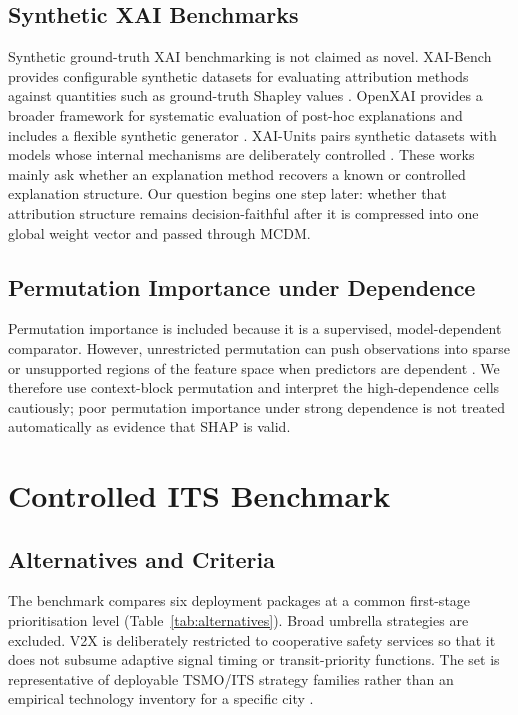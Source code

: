 \documentclass[runningheads]{llncs}
\begin{document}
\subsection{Synthetic XAI Benchmarks}

Synthetic ground-truth XAI benchmarking is not claimed as novel. XAI-Bench provides
configurable synthetic datasets for evaluating attribution methods against quantities such as
ground-truth Shapley values \cite{liu2021xaibench}. OpenXAI provides a broader framework for
systematic evaluation of post-hoc explanations and includes a flexible synthetic generator
\cite{agarwal2022openxai}. XAI-Units pairs synthetic datasets with models whose internal
mechanisms are deliberately controlled \cite{lee2025xaiunits}. These works mainly ask whether
an explanation method recovers a known or controlled explanation structure. Our question begins
one step later: whether that attribution structure remains decision-faithful after it is
compressed into one global weight vector and passed through MCDM.

\subsection{Permutation Importance under Dependence}

Permutation importance is included because it is a supervised, model-dependent comparator.
However, unrestricted permutation can push observations into sparse or unsupported regions of
the feature space when predictors are dependent \cite{hooker2021permutation}. We therefore use
context-block permutation and interpret the high-dependence cells cautiously; poor permutation
importance under strong dependence is not treated automatically as evidence that SHAP is
valid.

\section{Controlled ITS Benchmark}
\label{sec:benchmark}

\subsection{Alternatives and Criteria}

The benchmark compares six deployment packages at a common first-stage prioritisation level
(Table~\ref{tab:alternatives}). Broad umbrella strategies are excluded. V2X is deliberately
restricted to cooperative safety services so that it does not subsume adaptive signal timing or
transit-priority functions. The set is representative of deployable TSMO/ITS strategy families
rather than an empirical technology inventory for a specific city
\cite{fhwa2016corridors,fhwa2017atm,usdotv2x}.
\end{document}
